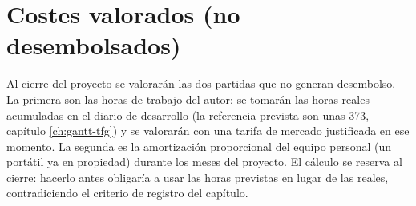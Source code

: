 \section{Costes valorados (no desembolsados)}
\label{sec:costes-valorados}

Al cierre del proyecto se valorarán las dos partidas que no generan desembolso.
La primera son las horas de trabajo del autor: se tomarán las horas reales acumuladas en el diario de desarrollo (la referencia prevista son unas 373, capítulo \ref{ch:gantt-tfg}) y se valorarán con una tarifa de mercado justificada en ese momento.
La segunda es la amortización proporcional del equipo personal (un portátil ya en propiedad) durante los meses del proyecto.
El cálculo se reserva al cierre: hacerlo antes obligaría a usar las horas previstas en lugar de las reales, contradiciendo el criterio de registro del capítulo.


